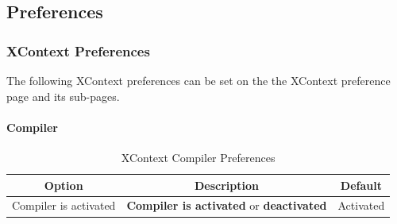 \subsection{Preferences}
\label{sec:preferences}

\subsubsection{XContext Preferences}
\label{sec:xcontext-preferences}
The following XContext preferences can be set on the  the XContext preference page and its sub-pages.

\paragraph{Compiler}
\begin{table}[!htbp]
  \centering
  \begin{tabular}{|p{}|p{}|p{}|}
    \hline
    \multicolumn{1}{|c}{\textbf{Option}} & \multicolumn{1}{|c}{\textbf{Description}} &%
                                                                                       \multicolumn{1}{|c|}{\textbf{Default}} \\
    \hline
    Compiler is activated & \textbf{Compiler is activated} or \textbf{deactivated} & Activated \\
    \hline
  \end{tabular}
  \caption{XContext Compiler Preferences}
  \label{tab:xcontext-compiler-preference}
\end{table}

